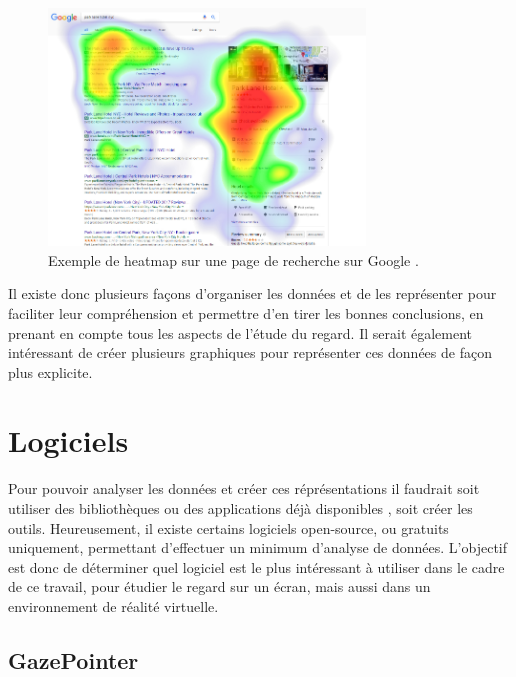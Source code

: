 \documentclass[hidelinks,12pt]{article}
\begin{document}
\begin{figure}[htpb]
  \centering
  \includegraphics[width=0.75\textwidth,keepaspectratio=true]{heatmap.png}
  \caption{Exemple de heatmap sur une page de recherche sur Google
    \cite{img_heatmap}.}
  \label{fig:heatmap}
\end{figure}

\bigskip
Il existe donc plusieurs façons d'organiser les données et de les représenter
pour faciliter leur compréhension et permettre d'en tirer les bonnes
conclusions, en prenant en compte tous les aspects de l'étude du regard. Il
serait également intéressant de créer plusieurs graphiques pour représenter ces
données de façon plus explicite.


\section{Logiciels}

Pour pouvoir analyser les données et créer ces réprésentations il faudrait soit
utiliser des bibliothèques ou des applications déjà disponibles
\cite{imotions_software}, soit créer les outils. Heureusement, il existe
certains logiciels open-source, ou gratuits uniquement, permettant d'effectuer
un minimum d'analyse de données. L'objectif est donc de déterminer quel
logiciel est le plus intéressant à utiliser dans le cadre de ce travail,
pour étudier le regard sur un écran, mais aussi dans un environnement de
réalité virtuelle.

\subsection{GazePointer}
\end{document}
